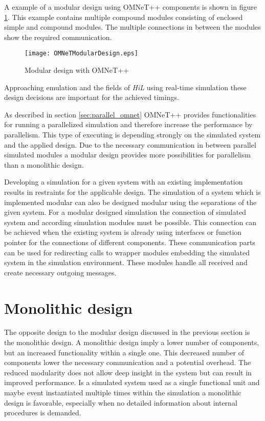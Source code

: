 A example of a modular design using OMNeT++ components is shown in figure \ref{fig:OMNeTModularDesign}.
This example contains multiple compound modules consisting of enclosed simple and compound modules.
The multiple connections in between the modules show the required communication.

\begin{figure}
    \centering
    \texttt{[image: OMNeTModularDesign.eps]}
    \caption{Modular design with OMNeT++}
    \label{fig:OMNeTModularDesign}
\end{figure}

Approaching emulation and the fields of \emph{HiL} using real-time simulation these design decisions are important for the achieved timings.

As described in section \ref{sec:parallel_omnet} OMNeT++ provides functionalities for running a parallelized simulation and therefore increase the performance by parallelism.
This type of executing is depending strongly on the simulated system and the applied design.
Due to the necessary communication in between parallel simulated modules a modular design provides more possibilities for parallelism than a monolithic design.

Developing a simulation for a given system with an existing implementation results in restraints for the applicable design.
The simulation of a system which is implemented modular can also be designed modular using the separations of the given system.
For a modular designed simulation the connection of simulated system and according simulation modules must be possible.
This connection can be achieved when the existing system is already using interfaces or function pointer for the connections of different components.
These communication parts can be used for redirecting calls to wrapper modules embedding the simulated system in the simulation environment.
These modules handle all received and create necessary outgoing messages.

\section{Monolithic design}
\label{sec:design_monolithic}
The opposite design to the modular design discussed in the previous section is the monolithic design.
A monolithic design imply a lower number of components, but an increased functionality within a single one.
This decreased number of components lower the necessary communication and a potential overhead.
The reduced modularity does not allow deep insight in the system but can result in improved performance.
Is a simulated system used as a single functional unit and maybe event instantiated multiple times within the simulation a monolithic design is favorable, especially when no detailed information about internal procedures is demanded.

